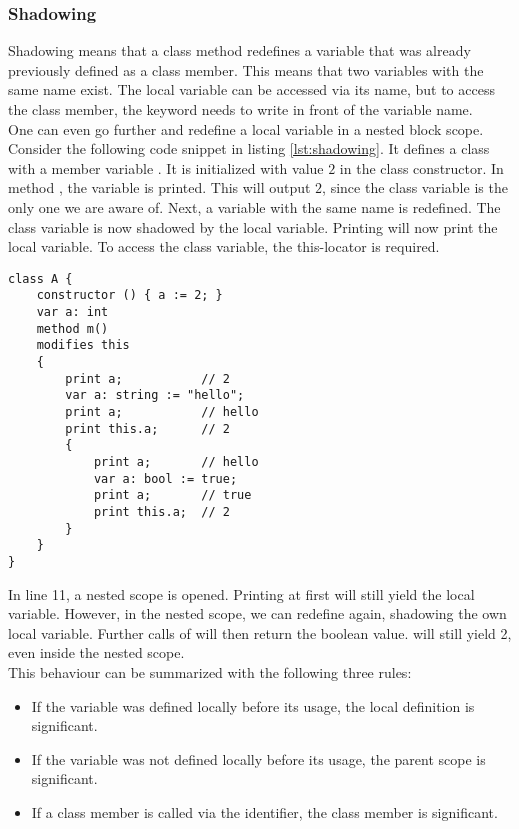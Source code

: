 \subsubsection{Shadowing}
Shadowing means that a class method redefines a variable that was already previously defined as a class member.
This means that two variables with the same name exist.
The local variable can be accessed via its name, but to access the class member,
the keyword  needs to write in front of the variable name.\\

One can even go further and redefine a local variable in a nested block scope.
Consider the following code snippet in listing \ref{lst:shadowing}.
It defines a class with a member variable .
It is initialized with value $2$ in the class constructor.
In method , the variable  is printed.
This will output $2$, since the class variable is the only one we are aware of.
Next, a variable with the same name is redefined.
The class variable is now shadowed by the local variable.
Printing  will now print the local variable.
To access the class variable, the this-locator is required.

\begin{lstlisting}[language = dafny, caption={Complex Shadowing Example}, captionpos=b, label={lst:shadowing}]
class A {
    constructor () { a := 2; }
    var a: int
    method m()
    modifies this
    {
        print a;           // 2
        var a: string := "hello";
        print a;           // hello
        print this.a;      // 2
        {
            print a;       // hello
            var a: bool := true;
            print a;       // true
            print this.a;  // 2
        }
    }
}
\end{lstlisting}

In line 11, a nested scope is opened.
Printing  at first will still yield the local variable.
However, in the nested scope, we can redefine  again, shadowing the own local variable.
Further calls of  will then return the boolean value.
 will still yield 2, even inside the nested scope.\\

This behaviour can be summarized with the following three rules:
\begin{itemize}
    \item If the variable was defined locally before its usage, the local definition is significant.
    \item If the variable was not defined locally before its usage, the parent scope is significant.
    \item If a class member is called via the  identifier, the class member is significant.
\end{itemize}

